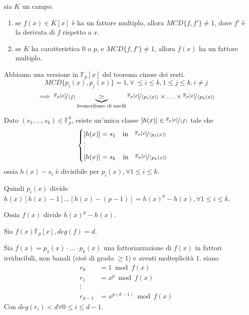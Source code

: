 \documentclass[10pt,a4paper,twoside]{book}
\begin{document}
\begin{theorem}
    sia $K$ un campo.
    \begin{enumerate}[label=\alph*)]
        \item se $f(x) \in K[x]$ è ha un fattore multiplo, allora $MCD\{f, f'\} \neq 1$, dove $f'$ è la derivata di $f$ rispetto a $x$.
        \item se $K$ ha caratteristica 0 o $p$, e $MCD\{f, f'\} \neq 1$, allora $f(x)$ ha un fattore multiplo.
    \end{enumerate}
\end{theorem}
Abbiamo una versione in $\mathbb{F}_p[x]$ del teorema cinese dei resti.
\begin{equation*}
    MCD\{ p_i(x), p_j(x)\} = 1, \forall \ \leq i \leq k, 1 \leq j \leq k, i \neq j
\end{equation*}
\begin{align*}
    \implies \nicefrac{\mathbb{F}_p[x]}{\langle f\rangle} \underbrace{\simeq}_{\text{Isomorfismo di anelli}} \nicefrac{\mathbb{F}_p[x]}{\langle p_1(x)\rangle} \times \ldots \times \nicefrac{\mathbb{F}_p[x]}{\langle p_k(x)\rangle}
\end{align*}

Dato $(s_1, \ldots, s_k) \in \mathbb{F}_p^k$, esiste un'unica classe $[h(x)] \in \nicefrac{\mathbb{F}_p[x]}{\langle f \rangle}$ tale che
\begin{equation*}
    \begin{cases}
        [h(x)] = s_1 \quad \text{in} \quad \nicefrac{\mathbb{F}_p[x]}{\langle p_1(x)\rangle} \\
        \vdots                                                                               \\
        [h(x)] = s_k \quad \text{in} \quad \nicefrac{\mathbb{F}_p[x]}{\langle p_k(x)\rangle}
    \end{cases}
\end{equation*}
ossia $h(x) - s_i$ è divisibile per $p_i(x), \forall 1 \leq i \leq k$.

Quindi $p_i(x)$ divide $h(x)[h(x) - 1] \ldots [h(x) - (p - 1)] = h(x)^p - h(x), \forall 1 \leq i \leq k$.

Ossia $f(x)$ divide $h(x)^p - h(x)$.


Sia $f(x) \mathbb{F}_p[x], deg(f) = d$.

Sia $f(x) = p_1(x)\cdot \ldots \cdot p_k(x)$ una fattoriazzazione di $f(x)$ in fattori irriducibili, non banali (cioè di grado $\geq 1$) e aventi molteplicità $1$. siano
\begin{align*}
    r_0       & = 1 \bmod f(x)            \\
    r_1       & = x^p \bmod f(x)          \\
    \vdots    &                           \\
    r_{d - 1} & = x^{p(d - 1)} \bmod f(x)
\end{align*}
Con $deg(r_i) < d \forall 0 \leq i \leq d - 1$.
\end{document}
